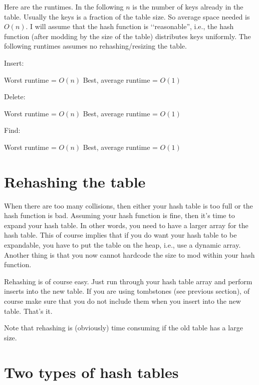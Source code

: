 Here are the runtimes.
In the following $n$ is the number of keys already in the table.
Usually the keys is a fraction of the table size.
So average space needed is $O(n)$.
I will assume that the hash function is \lq\lq reasonable'', i.e.,
the hash function (after modding by the size of the table)
distributes keys uniformly.
The following runtimes assumes no rehashing/resizing the table.
\begin{enumerate}
  \li Insert:
  \begin{tightlist}
    \li Worst runtime = $O(n)$
    \li Best, average runtime = $O(1)$
  \end{tightlist}
  \li Delete:
  \begin{tightlist}
    \li Worst runtime = $O(n)$
    \li Best, average runtime = $O(1)$
  \end{tightlist}
  \li Find:
  \begin{tightlist}
    \li Worst runtime = $O(n)$
    \li Best, average runtime = $O(1)$
  \end{tightlist}
\end{enumerate}


\newpage
\section{Rehashing the table}

When there are too many collisions, then either your hash table is
too full or the hash function is bad.
Assuming your hash function is fine, then it's time to expand your
hash table.
In other words, you need to have a larger array for the hash table.
This of course implies that if you do want your hash table
to be expandable, you have to put the table on the heap, i.e.,
use a dynamic array.
Another thing is that you now cannot hardcode the size to mod within
your hash function. 

Rehashing is of course easy.
Just run through your hash table array and perform inserts into the new
table.
If you are using tombstones (see previous section), of course make
sure that you do not include them when you insert into the new table.
That's it.

Note that rehashing is (obviously) time consuming if the old table
has a large size.




\newpage
\section{Two types of hash tables}

